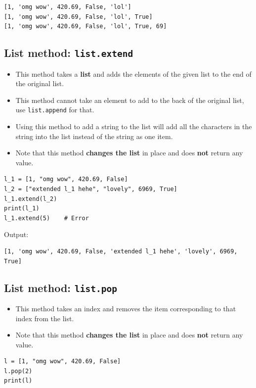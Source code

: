 \documentclass[11pt]{article}
\begin{document}
\begin{verbatim}
[1, 'omg wow', 420.69, False, 'lol']
[1, 'omg wow', 420.69, False, 'lol', True]
[1, 'omg wow', 420.69, False, 'lol', True, 69]
\end{verbatim}


 \newpage

\subsection{List method: \texttt{list.extend}}
\label{sec:org8c93a8b}
\begin{itemize}
\item This method takes a \textbf{list} and adds the elements of the given list to the end of the original list.
\item This method cannot take an element to add to the back of the original list, use \texttt{list.append} for that.
\item Using this method to add a string to the list will add all the characters in the string into the list instead of the string as one item.
\item Note that this method \textbf{changes the list} in place and does \textbf{not} return any value.
\end{itemize}

\begin{verbatim}
l_1 = [1, "omg wow", 420.69, False]
l_2 = ["extended l_1 hehe", "lovely", 6969, True]
l_1.extend(l_2)
print(l_1)
l_1.extend(5)    # Error
\end{verbatim}

 \noindent Output:

\begin{verbatim}
[1, 'omg wow', 420.69, False, 'extended l_1 hehe', 'lovely', 6969, True]
\end{verbatim}

\subsection{List method: \texttt{list.pop}}
\label{sec:org4d930bb}
\begin{itemize}
\item This method takes an index and removes the item corresponding to that index from the list.
\item Note that this method \textbf{changes the list} in place and does \textbf{not} return any value.
\end{itemize}
\begin{verbatim}
l = [1, "omg wow", 420.69, False]
l.pop(2)
print(l)
\end{verbatim}
\end{document}
